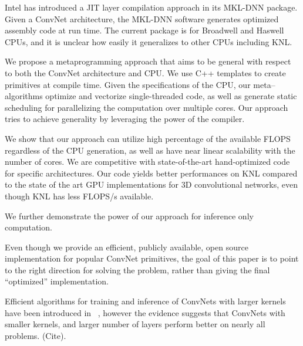   Intel has introduced a JIT layer compilation approach in its MKL-DNN
  package.  Given a ConvNet architecture, the MKL-DNN software
  generates optimized assembly code at run time.  The current package
  is for Broadwell and Haswell CPUs, and it is unclear how easily it
  generalizes to other CPUs including KNL.

  We propose a metaprogramming approach that aims to be general with
  respect to both the ConvNet architecture and CPU.  We use C++
  templates to create primitives at compile time.  Given the
  specifications of the CPU, our meta--algorithms optimize and
  vectorize single-threaded code, as well as generate static
  scheduling for parallelizing the computation over multiple cores.
  Our approach tries to achieve generality by leveraging the power of
  the compiler.

  We show that our approach can utilize high percentage of the
  available FLOPS regardless of the CPU generation, as well as have
  near linear scalability with the number of cores.  We are
  competitive with state-of-the-art hand-optimized code for specific
  architectures.  Our code yields better performances on KNL
  compared to the state of the art GPU implementations for 3D
  convolutional networks, even though KNL has less FLOPS/s available.

  We further demonstrate the power of our approach for inference only
  computation.


  Even though we provide an efficient, publicly available, open source
  implementation for popular ConvNet primitives, the goal of this
  paper is to point to the right direction for solving the problem,
  rather than giving the final ``optimized'' implementation.

  Efficient algorithms for training and inference of ConvNets with
  larger kernels have been introduced in
  ~\cite{zlateski2016znn,zlateski2016znni}, however the evidence
  suggests that ConvNets with smaller kernels, and larger number of
  layers perform better on nearly all problems. (Cite).


